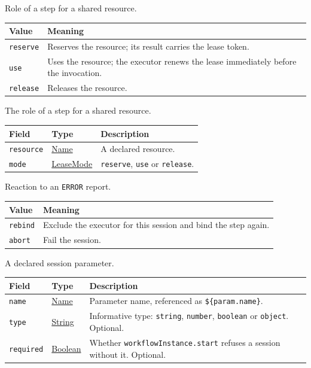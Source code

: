 \documentclass[a4paper]{arrowhead}
\newcommand{\mref}[1]{{\textcolor{ArrowheadPurple}{\hyperref[sec:model:#1]{#1}}}}
\newcommand{\pref}[1]{{\textcolor{ArrowheadGrey}{\hyperref[sec:model:primitives:#1]{#1}}}}
\begin{document}
Role of a step for a shared resource.

{\small
\begin{longtable}{|p{3.9cm}|p{11.9cm}|}

\hline
\rowcolor{gray!33} Value & Meaning \\ \hline
\endhead
\texttt{reserve} & Reserves the resource; its result carries the lease token. \\ \hline
\texttt{use} & Uses the resource; the executor renews the lease immediately before the invocation. \\ \hline
\texttt{release} & Releases the resource. \\ \hline
\end{longtable}
}

The role of a step for a shared resource.

{\small
\begin{longtable}{|p{3.9cm}|p{4.4cm}|p{7.5cm}|}

\hline
\rowcolor{gray!33} Field & Type & Description \\ \hline
\endhead
\texttt{resource} & \pref{Name} & A declared resource. \\ \hline
\texttt{mode} & \mref{LeaseMode} & \texttt{reserve}, \texttt{use} or \texttt{release}. \\ \hline
\end{longtable}
}

Reaction to an \texttt{ERROR} report.

{\small
\begin{longtable}{|p{3.9cm}|p{11.9cm}|}

\hline
\rowcolor{gray!33} Value & Meaning \\ \hline
\endhead
\texttt{rebind} & Exclude the executor for this session and bind the step again. \\ \hline
\texttt{abort} & Fail the session. \\ \hline
\end{longtable}
}

A declared session parameter.

{\small
\begin{longtable}{|p{3.9cm}|p{4.4cm}|p{7.5cm}|}

\hline
\rowcolor{gray!33} Field & Type & Description \\ \hline
\endhead
\texttt{name} & \pref{Name} & Parameter name, referenced as \texttt{\$\{param.name\}}. \\ \hline
\texttt{type} & \pref{String} & Informative type: \texttt{string}, \texttt{number}, \texttt{boolean} or \texttt{object}. Optional. \\ \hline
\texttt{required} & \pref{Boolean} & Whether \texttt{workflowInstance.start} refuses a session without it. Optional. \\ \hline
\end{longtable}
}
\end{document}
